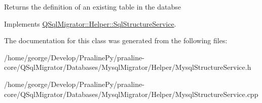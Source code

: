 \begin{DoxyReturn}{Returns}
the definition of an existing table in the databse 
\end{DoxyReturn}


Implements \hyperlink{class_q_sql_migrator_1_1_helper_1_1_sql_structure_service_abb2f11402700c1a1e52d596431255e8a}{Q\+Sql\+Migrator\+::\+Helper\+::\+Sql\+Structure\+Service}.



The documentation for this class was generated from the following files\+:\begin{DoxyCompactItemize}
\item 
/home/george/\+Develop/\+Praaline\+Py/praaline-\/core/\+Q\+Sql\+Migrator/\+Databases/\+Mysql\+Migrator/\+Helper/Mysql\+Structure\+Service.\+h\item 
/home/george/\+Develop/\+Praaline\+Py/praaline-\/core/\+Q\+Sql\+Migrator/\+Databases/\+Mysql\+Migrator/\+Helper/Mysql\+Structure\+Service.\+cpp\end{DoxyCompactItemize}
